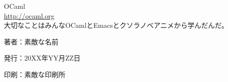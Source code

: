 \documentclass[9pt,b5paper,dvipdfmx,openany]{jsbook}
\begin{document}
\begin{thebibliography}{9}
   OCaml \\
    \href{http://ocaml.org}{http://ocaml.org} \\
    大切なことはみんなOCamlとEmacsとクソラノベアニメから学んだんだ。
\end{thebibliography}

\thispagestyle{empty}
\begin{flushright}
  \begin{minipage}{0.5\hsize}
    \begin{description}
    \item{著者：}素敵な名前
    \item{発行：}20XX年YY月ZZ日
    \item{印刷：}素敵な印刷所
    \end{description}
  \end{minipage}
\end{flushright}
\end{document}
